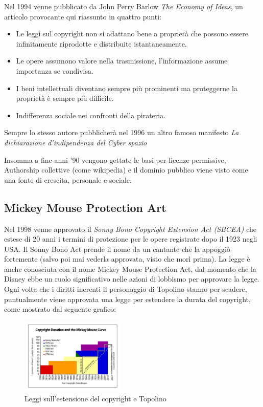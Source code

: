 Nel 1994 venne pubblicato da John Perry Barlow \textit{The Economy of Ideas}, un articolo provocante qui riassunto in quattro punti:
\begin{itemize}
\item Le leggi sul copyright non si adattano bene a proprietà che possono essere infinitamente riprodotte e distribuite istantaneamente.
\item Le opere assumono valore nella trasmissione, l'informazione assume importanza se condivisa.
\item I beni intellettuali diventano sempre più prominenti ma proteggerne la proprietà è sempre più difficile.
\item Indifferenza sociale nei confronti della pirateria.
\end{itemize}
Sempre lo stesso autore pubblicherà nel 1996 un altro famoso manifesto \textit{La dichiarazione d'indipendenza del Cyber spazio}

Insomma a fine anni '90 vengono gettate le basi per licenze permissive, Authorship collettive (come wikipedia) e il dominio pubblico viene visto come una fonte di crescita, personale e sociale.

\subsection{Mickey Mouse Protection Art}

Nel 1998 venne approvato il \textit{Sonny Bono Copyright
Extension Act (SBCEA)} che estese di 20 anni i termini di protezione per le opere registrate dopo il 1923 negli USA. Il Sonny Bono Act prende il nome da un cantante che la appoggiò fortemente (salvo poi mai vederla approvata, visto che morì prima). La legge è anche conosciuta con il nome Mickey Mouse Protection Act, dal momento che la Disney ebbe un ruolo significativo nelle azioni di lobbismo per approvare la legge. Ogni volta che i diritti inerenti il personaggio di Topolino stanno per scadere, puntualmente viene approvata una legge per estendere la durata del copyright, come mostrato dal seguente grafico:

\begin{figure}[htbp]
\centering
\includegraphics[width=50mm]{images/MM_copyright_graph}
\caption{Leggi sull'estensione del copyright e Topolino}
\end{figure}

